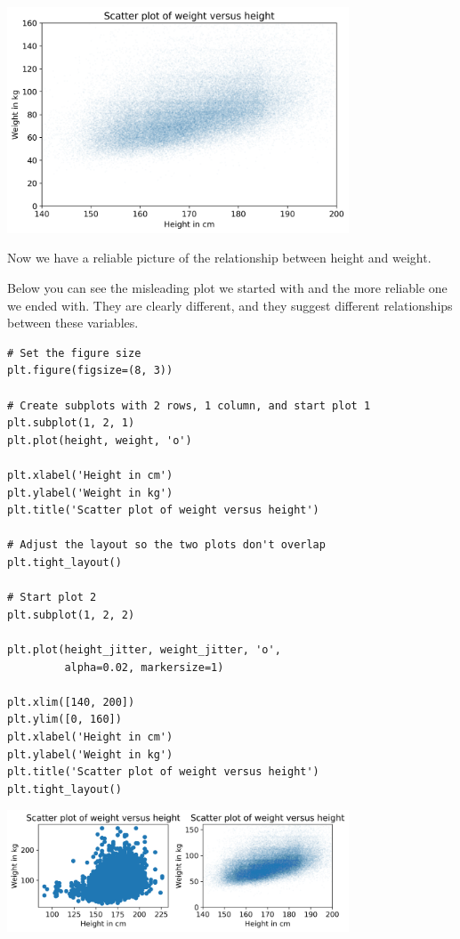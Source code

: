 \begin{center}
\includegraphics[width=4in]{chapters/09_relationships_files/09_relationships_25_0.png}
\end{center}

Now we have a reliable picture of the relationship between height and
weight.

Below you can see the misleading plot we started with and the more
reliable one we ended with. They are clearly different, and they suggest
different relationships between these variables.

\begin{lstlisting}[]
# Set the figure size
plt.figure(figsize=(8, 3))

# Create subplots with 2 rows, 1 column, and start plot 1
plt.subplot(1, 2, 1)
plt.plot(height, weight, 'o')

plt.xlabel('Height in cm')
plt.ylabel('Weight in kg')
plt.title('Scatter plot of weight versus height')

# Adjust the layout so the two plots don't overlap
plt.tight_layout()

# Start plot 2
plt.subplot(1, 2, 2)

plt.plot(height_jitter, weight_jitter, 'o', 
         alpha=0.02, markersize=1)

plt.xlim([140, 200])
plt.ylim([0, 160])
plt.xlabel('Height in cm')
plt.ylabel('Weight in kg')
plt.title('Scatter plot of weight versus height')
plt.tight_layout()
\end{lstlisting}

\begin{center}
\includegraphics[width=4in]{chapters/09_relationships_files/09_relationships_27_0.png}
\end{center}

